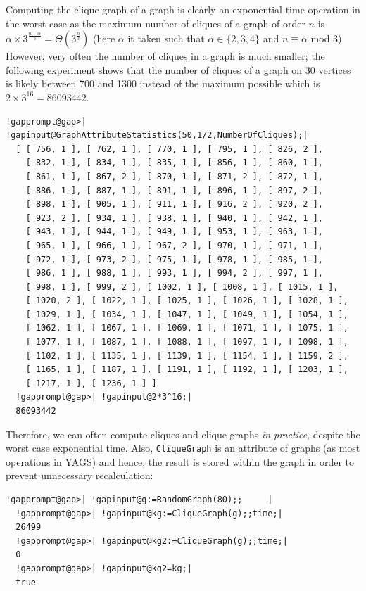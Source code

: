 \documentclass[a4paper,11pt]{report}
\begin{document}
{{Computing the clique graph of a graph is clearly an exponential time operation
in the worst case as the maximum number of cliques of a graph of order $n$ is $\alpha\times 3^{\frac{n-\alpha}{3}}= \Theta(3^{\frac{n}{3}})$ \cite{MM65} (here $\alpha$ it taken such that $\alpha \in \{2,3,4\}$ and $n\equiv \alpha$ mod 3). However, very often the number of cliques in a graph is much smaller;
the following experiment shows that the number of cliques of a graph on 30
vertices is likely between 700 and 1300 instead of the maximum possible which
is $2\times3^{16}=86093442$. 

 
\begin{Verbatim}[commandchars=!@|,fontsize=\small,frame=single,label=Example]
  !gapprompt@gap>| !gapinput@GraphAttributeStatistics(50,1/2,NumberOfCliques);|
  [ [ 756, 1 ], [ 762, 1 ], [ 770, 1 ], [ 795, 1 ], [ 826, 2 ], 
    [ 832, 1 ], [ 834, 1 ], [ 835, 1 ], [ 856, 1 ], [ 860, 1 ], 
    [ 861, 1 ], [ 867, 2 ], [ 870, 1 ], [ 871, 2 ], [ 872, 1 ], 
    [ 886, 1 ], [ 887, 1 ], [ 891, 1 ], [ 896, 1 ], [ 897, 2 ], 
    [ 898, 1 ], [ 905, 1 ], [ 911, 1 ], [ 916, 2 ], [ 920, 2 ], 
    [ 923, 2 ], [ 934, 1 ], [ 938, 1 ], [ 940, 1 ], [ 942, 1 ], 
    [ 943, 1 ], [ 944, 1 ], [ 949, 1 ], [ 953, 1 ], [ 963, 1 ], 
    [ 965, 1 ], [ 966, 1 ], [ 967, 2 ], [ 970, 1 ], [ 971, 1 ], 
    [ 972, 1 ], [ 973, 2 ], [ 975, 1 ], [ 978, 1 ], [ 985, 1 ], 
    [ 986, 1 ], [ 988, 1 ], [ 993, 1 ], [ 994, 2 ], [ 997, 1 ], 
    [ 998, 1 ], [ 999, 2 ], [ 1002, 1 ], [ 1008, 1 ], [ 1015, 1 ], 
    [ 1020, 2 ], [ 1022, 1 ], [ 1025, 1 ], [ 1026, 1 ], [ 1028, 1 ], 
    [ 1029, 1 ], [ 1034, 1 ], [ 1047, 1 ], [ 1049, 1 ], [ 1054, 1 ], 
    [ 1062, 1 ], [ 1067, 1 ], [ 1069, 1 ], [ 1071, 1 ], [ 1075, 1 ], 
    [ 1077, 1 ], [ 1087, 1 ], [ 1088, 1 ], [ 1097, 1 ], [ 1098, 1 ], 
    [ 1102, 1 ], [ 1135, 1 ], [ 1139, 1 ], [ 1154, 1 ], [ 1159, 2 ], 
    [ 1165, 1 ], [ 1187, 1 ], [ 1191, 1 ], [ 1192, 1 ], [ 1203, 1 ], 
    [ 1217, 1 ], [ 1236, 1 ] ]
  !gapprompt@gap>| !gapinput@2*3^16;|
  86093442
\end{Verbatim}
 

Therefore, we can often compute cliques and clique graphs \emph{in practice}, despite the worst case exponential time. Also, \texttt{CliqueGraph} is an attribute of graphs (as most operations in \textsf{YAGS}) and hence, the result is stored within the graph in order to prevent
unnecessary recalculation: 

 
\begin{Verbatim}[commandchars=!@|,fontsize=\small,frame=single,label=Example]
  !gapprompt@gap>| !gapinput@g:=RandomGraph(80);;     |
  !gapprompt@gap>| !gapinput@kg:=CliqueGraph(g);;time;|
  26499
  !gapprompt@gap>| !gapinput@kg2:=CliqueGraph(g);;time;|
  0
  !gapprompt@gap>| !gapinput@kg2=kg;|
  true
\end{Verbatim}
 

}}
\end{document}
